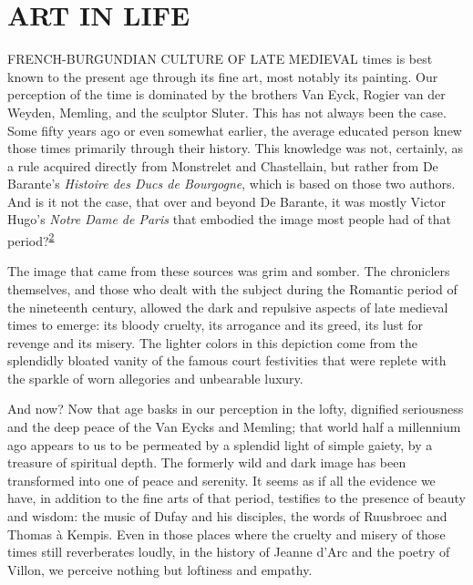 \chapter{ART IN LIFE}

FRENCH-BURGUNDIAN CULTURE OF LATE MEDIEVAL times is best known to the
present age through its fine art, most notably its painting. Our
perception of the time is dominated by the brothers Van Eyck, Rogier van
der Weyden, Memling, and the sculptor Sluter. This has not always been
the case. Some fifty years ago or even somewhat earlier, the average
educated person knew those times primarily through their history. This
knowledge was not, certainly, as a rule acquired directly from
Monstrelet and Chastellain, but rather from De Barante's \emph{Histoire
des Ducs de Bourgogne}, which is based on those two authors. And is it
not the case, that over and beyond De Barante, it was mostly Victor
Hugo's \emph{Notre Dame de Paris} that embodied the image most people
had of that
period?\textsuperscript{\protect\hypertarget{19_Chapter_Twelve__ART_IN_LIFE.xhtmlux5cux23id_468}{\protect\hyperlink{23_NOTES.xhtmlux5cux23id_469}{2}}}

The image that came from these sources was grim and somber. The
chroniclers themselves, and those who dealt with the subject during the
Romantic period of the nineteenth century, allowed the dark and
repulsive aspects of late medieval times to emerge: its bloody cruelty,
its arrogance and its greed, its lust for revenge and its misery. The
lighter colors in this depiction come from the splendidly bloated vanity
of the famous court festivities that were replete with the sparkle of
worn allegories and unbearable luxury.

And now? Now that age basks in our perception in the lofty, dignified
seriousness and the deep peace of the Van Eycks and Memling; that world
half a millennium ago appears to us to be permeated by a splendid light
of simple gaiety, by a treasure of spiritual depth. The formerly wild
and dark image has been transformed into one of peace and serenity. It
seems as if all the evidence we have, in addition to the fine arts of
that period, testifies to the presence of beauty and wisdom: the music
of Dufay and his disciples, the words of Ruusbroec and Thomas à Kempis.
Even in those places where the cruelty and misery of those times still
reverberates
\protect\hypertarget{19_Chapter_Twelve__ART_IN_LIFE.xhtmlux5cux23page_295}{}{}loudly,
in the history of Jeanne d'Arc and the poetry of Villon, we perceive
nothing but loftiness and empathy.


